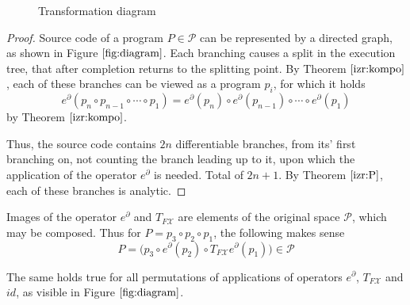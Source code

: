 \documentclass[11pt]{article}
\newcommand{\X}{\mathcal{X}}
\newcommand{\dP}{\mathcal{P}}
\newcommand{\D}{\partial}
\begin{document}
\begin{figure}
\begin{center}
\caption{Transformation diagram} \label{fig:diagram}
\end{center}
\end{figure}


\begin{proof}
	Source code of a program $P\in\dP$ can be represented by a directed graph, as shown in Figure $\ref{fig:diagram}$. Each branching causes a split in the execution tree, that after completion returns to the splitting point.
	By Theorem $\ref{izr:kompo}$, each of these branches can be viewed as a program $p_i$, for which it holds $$e^\D(p_n\circ p_{n-1}\circ\cdots\circ p_1)=e^\D(p_n)\circ e^\D(p_{n-1})\circ\cdots\circ e^\D(p_1)$$ by Theorem $\ref{izr:kompo}$.
	
	Thus, the source code contains $2n$ differentiable branches, from its' first branching on, not counting the branch leading up to it, upon which the application of the operator $e^\D$ is needed. Total of $2n+1$. By Theorem $\ref{izr:P}$, each of these branches is analytic.
\end{proof}


\begin{remark}\label{trd:composeOperators}
Images of the operator $e^\D$ and $T_{F\X}$  are elements of the original space $\dP$, which may be composed. Thus for $P=p_3\circ p_2\circ p_1$, the following makes sense
\begin{equation*}
P=\Big(p_3\circ e^ \D(p_2)\circ T_{F\X}e^\D(p_1)\Big) \in \dP
\end{equation*}

The same holds true for all permutations of applications of operators $e^\D$, $T_{F\X}$ and $id$, as visible in Figure $\ref{fig:diagram}$.
\end{remark}
\end{document}
